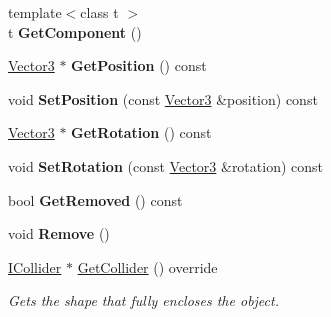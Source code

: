 \begin{DoxyCompactItemize}
\item 
\mbox{\label{class_flounder_1_1_entity_a1703808379fe5f74d9af280a1669bdc2}} 
{\footnotesize template$<$class t $>$ }\\t {\bfseries Get\+Component} ()
\item 
\mbox{\label{class_flounder_1_1_entity_ac515a778b382189a2e46de7613c82e3c}} 
\hyperlink{class_flounder_1_1_vector3}{Vector3} $\ast$ {\bfseries Get\+Position} () const
\item 
\mbox{\label{class_flounder_1_1_entity_ad8b3c3b3aa8a6263b5d08d0948d0d46b}} 
void {\bfseries Set\+Position} (const \hyperlink{class_flounder_1_1_vector3}{Vector3} \&position) const
\item 
\mbox{\label{class_flounder_1_1_entity_a57cd2fa3934c35ef09c4f5a54ca7b030}} 
\hyperlink{class_flounder_1_1_vector3}{Vector3} $\ast$ {\bfseries Get\+Rotation} () const
\item 
\mbox{\label{class_flounder_1_1_entity_a309ede132c8c9e984840488cf91dd0ac}} 
void {\bfseries Set\+Rotation} (const \hyperlink{class_flounder_1_1_vector3}{Vector3} \&rotation) const
\item 
\mbox{\label{class_flounder_1_1_entity_aaafa65500ae260523967d94d990ce4f4}} 
bool {\bfseries Get\+Removed} () const
\item 
\mbox{\label{class_flounder_1_1_entity_af5dac562011b0939fcbdf7a277d8b794}} 
void {\bfseries Remove} ()
\item 
\hyperlink{class_flounder_1_1_i_collider}{I\+Collider} $\ast$ \hyperlink{class_flounder_1_1_entity_ae56c103b9af5861733701dca4f30cee9}{Get\+Collider} () override
\begin{DoxyCompactList}\small\item\em Gets the shape that fully encloses the object. \end{DoxyCompactList}\end{DoxyCompactItemize}
